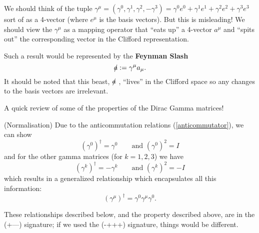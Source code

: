 We should think of the tuple $\gamma^{\mu} = \left(\gamma^0, \gamma^1, \gamma^2, -\gamma^3 \right) = \gamma^{0}e^0 + \gamma^1e^1 + \gamma^2e^2 + \gamma^3e^3$ sort of as a 4-vector (where $e^\mu$ is the basis vectors). But this is misleading! We should view the $\gamma^\mu$ as a mapping operator that ``eats up'' a 4-vector $a^\mu$ and ``spits out'' the corresponding vector in the Clifford representation.

Such a result would be represented by the \textbf{Feynman Slash}
\begin{equation}
\slashed{a} := \gamma^\mu a_\mu. 
\end{equation}
It should be noted that this beast, $\slashed{a}$ \!\!, ``lives'' in the Clifford space so any changes to the basis vectors are irrelevant.

A quick review of some of the properties of the Dirac Gamma matrices!

\begin{property}{(Normalisation)}
Due to the anticommutation relations (\ref{anticommutator}), we can show
\begin{equation}
\left(\gamma^0\right)^\dag = \gamma^0\qquad\textrm{and }\left(\gamma^0\right)^2 = I
\end{equation}
and for the other gamma matrices (for $k=1,2,3$) we have
\begin{equation}
\left(\gamma^k\right)^\dag = -\gamma^k\qquad\textrm{and }\left(\gamma^k\right)^2 = -I
\end{equation}
which results in a generalized relationship which encapsulates all this information:
\begin{equation}
\left( \gamma^\mu \right)^\dagger = \gamma^0 \gamma^\mu \gamma^0.
\end{equation}
\end{property}

\begin{rmk}
These relationships described below, and the property described above, are in the (+---) signature; if we used the (-+++) signature, things would be different.
\end{rmk}

